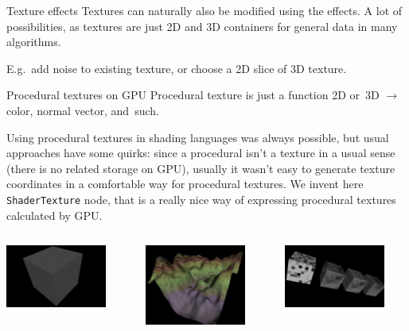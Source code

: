 \documentclass{beamer}
\begin{document}
\begin{frame}[fragile]{Texture effects}
Textures can naturally also be modified using the effects.
A lot of possibilities, as textures are just 2D and 3D containers for general data
in many algorithms.

\vspace{0.1in}

E.g.~add noise to existing texture, or choose a 2D slice of 3D texture.
\end{frame}

\begin{frame}[fragile]{Procedural textures on GPU}
Procedural texture is just a function 2D or~3D $\rightarrow$
color, normal vector, and~such.

\vspace{0.1in}

Using procedural textures in shading languages was always possible,
but usual approaches have some quirks: since a procedural isn't a texture
in a usual sense (there is no related storage on GPU), usually it wasn't
easy to generate texture coordinates in a comfortable way for procedural
textures. We invent here \texttt{ShaderTexture} node, that is a really
nice way of expressing procedural textures calculated by GPU.

\begin{center}
\begin{columns}[T]
  \begin{column}{1in}
    \includegraphics[width=1.3in]{../shader_texture_edge_detection}
  \end{column}
  \begin{column}{1in}
    \includegraphics[width=1.3in]{../terrain}
  \end{column}
  \begin{column}{1in}
    \includegraphics[width=1.3in]{../noise}
  \end{column}
\end{columns}
\end{center}

\end{frame}
\end{document}
